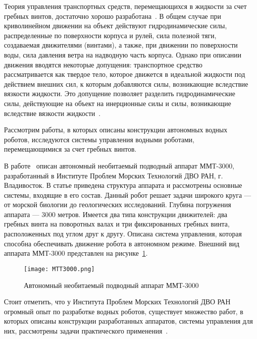 Теория управления транспортных средств, перемещающихся в жидкости за счет гребных винтов, достаточно хорошо разработана~\cite{Ageev, Fossen, Fossen2, Basin_Anfimov_1961, Lebedev_Pershits_1969}. В общем случае при криволинейном движении на объект действуют гидродинамические силы, распределенные по поверхности корпуса и рулей, сила полезной тяги, создаваемая движителями (винтами), а также, при движении по поверхности воды, сила давления ветра на надводную часть корпуса. Однако при описании движения вводятся некоторые допущения: транспортное средство рассматривается как твердое тело, которое движется в идеальной жидкости под действием внешних сил, к которым добавляются силы, возникающие вследствие вязкости жидкости. Это допущение позволяет разделить гидродинамические силы, действующие на объект на инерционные силы и силы, возникающие вследствие вязкости жидкости~\cite{Basin_Anfimov_1961}.

Рассмотрим работы, в которых описаны конструкции автономных водных роботов, исследуются системы управления водными роботами, перемещающимися за счет гребных винтов.

В работе~\cite{Gornak_MMT3000} описан автономный необитаемый подводный аппарат ММТ-3000, разработанный в Институте Проблем Морских Технологий ДВО РАН, г. Владивосток. В статье приведена структура аппарата и рассмотрены основные системы, входящие в его состав. Данный робот решает задачи широкого круга --- от морской биологии до геологических исследований. Глубина погружения аппарата --- 3000 метров. Имеется два типа конструкции движителей: два гребных винта на поворотных валах и три фиксированных гребных винта, расположенных под углом друг к другу. Описана система управления, которая способна обеспечивать движение робота в автономном режиме. Внешний вид аппарата ММТ-3000 представлен на рисунке~\ref{MTT3000}. 

\begin{figure}[h]
	\centering
	\texttt{[image: MTT3000.png]}%
	\caption{Автономный необитаемый подводный аппарат ММТ-3000}
	\label{MTT3000}
\end{figure}

Стоит отметить, что у Института Проблем Морских Технологий ДВО РАН огромный опыт по разработке водных роботов, существует множество работ, в которых описаны конструкции разработанных аппаратов, системы управления для них, рассмотрены задачи практического применения~\cite{Inzarcev_2018_book, Matvienko_2017, Naumov_2011, Boreyko_2011, Iznarcev_2007, Vaulin_2017, Inzarcev_2016}.

